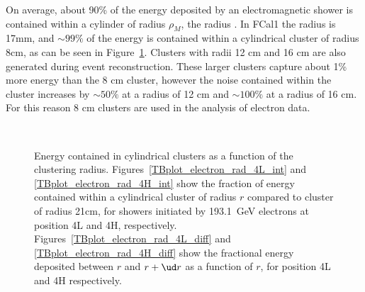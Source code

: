 On average, about 90\% of the energy deposited by an electromagnetic shower is contained within a cylinder of radius $\rho_M$, the \moliere radius \cite{fabiola_calorimetry}. In FCal1 the \moliere radius is 17mm, and $\sim 99\%$ of the energy is contained within a cylindrical cluster of radius 8cm, as can be seen in Figure~\ref{TBplot_electron_radials}. Clusters with radii 12 cm and 16 cm are also generated during event reconstruction. These larger clusters capture about 1\% more energy than the 8 cm cluster, however the noise contained within the cluster increases by $\sim50 \%$ at a radius of 12 cm and  $\sim100 \%$ at a radius of 16 cm. For this reason 8 cm clusters are used in the analysis of electron data. 



\begin{figure}[!htbp]
\begin{centering}
\\
\caption{Energy contained in cylindrical clusters as a function of the clustering radius. Figures~\ref{TBplot_electron_rad_4L_int} and \ref{TBplot_electron_rad_4H_int} show the fraction of energy contained within a cylindrical cluster of radius $r$ compared to cluster of radius 21cm, for showers initiated by 193.1~GeV electrons at position 4L and 4H, respectively. Figures~\ref{TBplot_electron_rad_4L_diff} and \ref{TBplot_electron_rad_4H_diff} show the fractional energy deposited between $r$ and $r+\ud r$ as a function of $r$, for position 4L and 4H respectively.} 
\label{TBplot_electron_radials}
\end{centering}
\end{figure}





